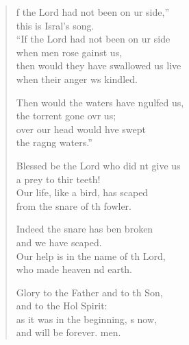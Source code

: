 \settowidth{\versewidth}{then would they have swallowed us alive *}
\begin{verse}%
  \begin{patverse}
f the Lord had not been on ur side,”\Med\\
this is Isral’s song.\\
“If the Lord had not been on ur side\Med\\
when men rose gainst us,\\
then would they have swallowed us live\Med\\
when their anger ws kindled.

Then would the waters have ngulfed us,\Med\\
the torrent gone ovr us;\\
over our head would hve swept\Med\\
the rag\pointup{\i}ng waters.”

Blessed be the Lord who did nt give us\Med\\
a prey to thir teeth!\\
Our life, like a bird, has scaped\Med\\
from the snare of th fowler.

Indeed the snare has ben broken\Med\\
and we have scaped.\\
Our help is in the name of th Lord,\Med\\
who made heaven nd earth.

Glory to the Father and to th Son,\Med\\
and to the Hol Spirit:\\
as it was in the beginning, \pointup{\i}s now,\Med\\
and will be forever. men. 
  \end{patverse}
\end{verse}
